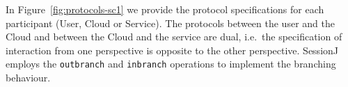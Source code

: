 \documentclass[10pt]{llncs}
\begin{document}
%

In Figure~\ref{fig:protocols-sc1} we provide the protocol specifications for each participant (User, Cloud or Service).
The protocols between the user and the Cloud and between the Cloud and the service are dual, i.e.\ the specification of interaction from one perspective is opposite to the other perspective.
SessionJ employs the \texttt{outbranch} and \texttt{inbranch} operations to implement the branching behaviour.

\end{document}
